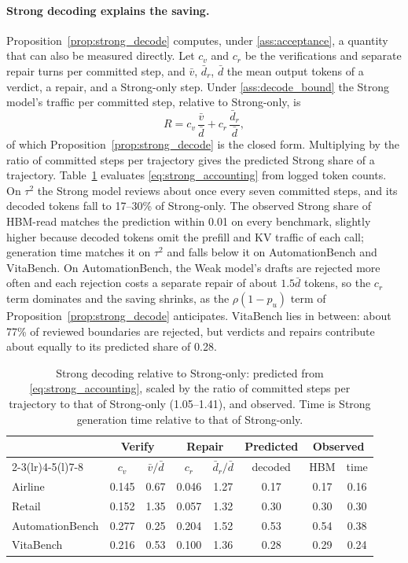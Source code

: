 \documentclass[11pt, copyright, logo, secondlogo]{template/lark}
\begin{document}
\paragraph{Strong decoding explains the saving.}
Proposition~\ref{prop:strong_decode} computes, under
\cref{ass:acceptance}, a quantity that can also be measured directly. Let
$c_v$ and $c_r$ be the verifications and separate repair turns per committed
step, and $\bar v$, $\bar d_r$, $\bar d$ the mean output tokens of a verdict, a
repair, and a Strong-only step. Under \cref{ass:decode_bound} the Strong
model's traffic per committed step, relative to Strong-only, is
\begin{equation}
R=c_v\,\frac{\bar v}{\bar d}+c_r\,\frac{\bar d_r}{\bar d},
\label{eq:strong_accounting}
\end{equation}
of which Proposition~\ref{prop:strong_decode} is the closed form. Multiplying
by the ratio of committed steps per trajectory gives the predicted Strong
share of a trajectory. Table~\ref{tab:strong_accounting} evaluates
\eqref{eq:strong_accounting} from logged token counts. On $\tau^2$ the Strong
model reviews about once every seven committed steps, and its decoded
tokens fall to 17--30\% of Strong-only. The observed Strong share of
HBM-read matches the prediction within 0.01 on every benchmark, slightly
higher because decoded tokens omit the prefill and KV traffic of each call;
generation time matches it on $\tau^2$ and falls below it on AutomationBench
and VitaBench. On AutomationBench, the Weak model's drafts are rejected more often
and each rejection costs a separate repair of about $1.5\bar d$ tokens, so
the $c_r$ term dominates and the saving shrinks, as the $\rho(1-p_u)$ term of
Proposition~\ref{prop:strong_decode} anticipates. VitaBench lies in between:
about 77\% of reviewed boundaries are rejected, but verdicts and repairs
contribute about equally to its predicted share of 0.28.

\begin{table}[b]
\caption{Strong decoding relative to Strong-only: predicted from
\eqref{eq:strong_accounting}, scaled by the ratio of committed steps per
trajectory to that of Strong-only (1.05--1.41), and observed. Time is Strong
generation time relative to that of Strong-only.}
  \label{tab:strong_accounting}
\centering
\small
\setlength{\tabcolsep}{4pt}
\begin{tabular}{@{}lccccccc@{}}
\toprule
& \multicolumn{2}{c}{Verify} & \multicolumn{2}{c}{Repair} & Predicted &
\multicolumn{2}{c}{Observed} \\
\cmidrule(lr){2-3}\cmidrule(lr){4-5}\cmidrule(l){7-8}
& $c_v$ & $\bar v/\bar d$ & $c_r$ & $\bar d_r/\bar d$ & decoded & HBM & time \\
\midrule
Airline & 0.145 & 0.67 & 0.046 & 1.27 & 0.17 & 0.17 & 0.16 \\
Retail & 0.152 & 1.35 & 0.057 & 1.32 & 0.30 & 0.30 & 0.30 \\
AutomationBench & 0.277 & 0.25 & 0.204 & 1.52 & 0.53 & 0.54 & 0.38 \\
VitaBench & 0.216 & 0.53 & 0.100 & 1.36 & 0.28 & 0.29 & 0.24 \\
\bottomrule
\end{tabular}
\end{table}
\end{document}
